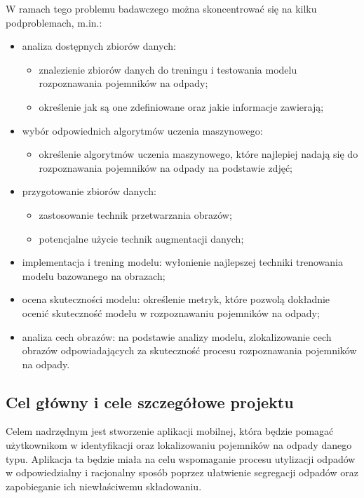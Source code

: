 \documentclass[12pt, a4paper, twoside, openany]{book}
\newcommand{\forceindent}{\leavevmode{\parindent=1.3em\indent}}
\begin{document}
W ramach tego problemu badawczego można skoncentrować się na kilku podproblemach, m.in.:
\begin{itemize}
    \item analiza dostępnych zbiorów danych:
          \begin{itemize}
              \item znalezienie zbiorów danych do treningu i testowania modelu rozpoznawania pojemników na odpady;
              \item określenie jak są one zdefiniowane oraz jakie informacje zawierają;
          \end{itemize}
    \item wybór odpowiednich algorytmów uczenia maszynowego:
          \begin{itemize}
              \item określenie algorytmów uczenia maszynowego, które najlepiej nadają się do rozpoznawania pojemników na odpady na podstawie zdjęć;
          \end{itemize}
    \item przygotowanie zbiorów danych:
          \begin{itemize}
              \item zastosowanie technik przetwarzania obrazów;
              \item potencjalne użycie technik augmentacji danych;
          \end{itemize}
    \item implementacja i trening modelu: wyłonienie najlepszej techniki trenowania modelu bazowanego na obrazach;
    \item ocena skuteczności modelu: określenie metryk, które pozwolą dokładnie ocenić skuteczność modelu w rozpoznawaniu pojemników na odpady;
    \item analiza cech obrazów: na podstawie analizy modelu, zlokalizowanie cech obrazów odpowiadających za skuteczność procesu rozpoznawania pojemników na odpady.
\end{itemize}

\subsection{Cel główny i cele szczegółowe projektu}

\forceindent Celem nadrzędnym jest stworzenie aplikacji mobilnej, która będzie pomagać użytkownikom w identyfikacji oraz lokalizowaniu pojemników na odpady danego typu. Aplikacja ta będzie miała na celu wspomaganie procesu utylizacji odpadów w odpowiedzialny i racjonalny sposób poprzez ułatwienie segregacji odpadów oraz zapobieganie ich niewłaściwemu składowaniu.
\end{document}

